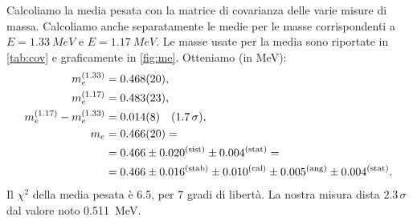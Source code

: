 Calcoliamo la media pesata con la matrice di covarianza delle varie misure di massa.
Calcoliamo anche separatamente le medie per le masse corrispondenti a $E=\SI{1.33}{MeV}$ e $E=\SI{1.17}{MeV}$.
Le masse usate per la media sono riportate in \autoref{tab:cov} e graficamente in \autoref{fig:me}.
Otteniamo (in \si{MeV}):
\begin{align*}
	m_e^{(1.33)}                &= \num{0.468 \pm 0.020}  ,    \\
	m_e^{(1.17)}                &= \num{0.483 \pm 0.023}  ,    \\
	m_e^{(1.17)} - m_e^{(1.33)} &= \num{0.014 \pm 0.008}  \quad(1.7\,\sigma),   \\
	m_e                         &= \num{0.466 \pm 0.020} = \\
	                            &=      0.466 \pm 0.020^{(\text{sist})} \pm 0.004^{(\text{stat})} = \\
										 &=      0.466 \pm 0.016^{(\text{stab})} \pm 0.010^{(\text{cal})} \pm 0.005^{(\text{ang})} \pm 0.004^{(\text{stat})}.
\end{align*}
Il $\chi^2$ della media pesata è 6.5, per 7 gradi di libertà.
La nostra misura dista $2.3\,\sigma$ dal valore noto \SI{0.511}{MeV}.
